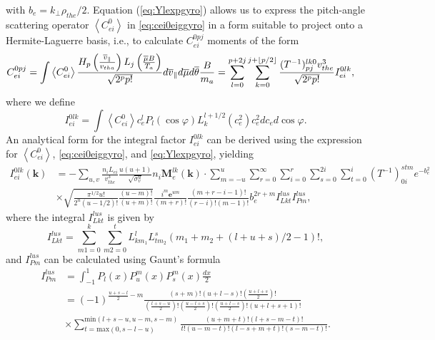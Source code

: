 %
with $b_e=k_\perp \rho_{the}/2$.
%
Equation (\ref{eq:Ylexpgyro}) allows us to express the pitch-angle scattering operator $\left<C_{ei}^0\right>$ in \cref{eq:cei0eiggyro} in a form suitable to project onto a Hermite-Laguerre basis, i.e., to calculate $C_{ei}^{0pj}$ moments of the form
%
\begin{align}
    C_{ei}^{0pj}&=\int \left<C_{ei}^0\right> \frac{H_p\left(\frac{\overline v_{\parallel}}{v_{tha}}\right)L_j\left(\frac{\overline \mu B}{T_a}\right) }{\sqrt{2^p p!}}  d\overline v_\parallel d \overline \mu d \overline \theta \frac{B}{m_a}=\sum_{l=0}^{p+2j}\sum_{k=0}^{j+\lfloor p/2\rfloor}\frac{(T^{-1})_{pj}^{lk0}v_{the}^3}{\sqrt{2^p p!}} I_{ei}^{0lk},
\label{eq:ceiopjgg}
\end{align}
%
where we define
%
\begin{equation}
    I_{ei}^{0lk}=\int \left<C_{ei}^0\right> c_e^l P_l(\cos \varphi) L_k^{l+1/2}(c_e^2) c_e^2 dc_e d\cos \varphi.
\label{eq:iei0lk}
\end{equation}
%
An analytical form for the integral factor $I_{ei}^{0lk}$ can be derived using the expression for $\left<C_{ei}^0\right>$, \cref{eq:cei0eiggyro}, and \cref{eq:Ylexpgyro}, yielding
%
\begin{align}
    I_{ei}^{0lk}(\mathbf k)&=-\sum_{u,v}\frac{n_i L_{ei}}{v_{the}^3}\frac{u(u+1)}{\sqrt{\sigma_v^u}} n_i \mathbf M_{e}^{lk}(\mathbf k) \cdot\sum_{m=-u}^u \sum_{r=0}^\infty \sum_{i=0}^{r}\sum_{s=0}^{2i}\sum_{t=0}^i(T^{-1})_{0i}^{stm}e^{-b_e^2}\nonumber\\
    &\times \sqrt{\frac{\pi^{1/2}u!}{2^u(u-1/2)!}\frac{(u-m)!}{(u+m)!}}\frac{i^m \mathbf e^{um}}{(m+r)!}\frac{(m+r-i-1)!}{(r-i)!(m-1)!}b_e^{2r+m}I_{L k t}^{l u s}I_{Pm}^{l u s},
\end{align}
%
where the integral $I_{L k t}^{l u s}$ is given by
%
\begin{equation}
    I_{L k t}^{l u s}=\sum_{m1=0}^{k}\sum_{m2=0}^{t}{L_{km_1}^{l}L_{tm_2}^s}(m_1+m_2+(l+u+s)/2-1)!,
\end{equation}
%
and $I_{Pm}^{l u s}$ can be calculated using Gaunt's formula \citep{Gaunt1929}
%
\begin{align}
    I_{Pm}^{l u s}&=\int_{-1}^{1} P_l(x)P_{u}^m(x)P_{s}^m(x) \frac{dx}{2}\nonumber\\
    &=(-1)^{\frac{u+s-l}{2}-m}\frac{(s+m)!(u+l-s)!\left(\frac{u+l+s}{2}\right)!}{\left(\frac{l+s-u}{2}\right)!\left(\frac{u-l+s}{2}\right)!\left(\frac{u+l-s}{2}\right)!(u+l+s+1)!}\nonumber\\
    &\times\sum_{t=\text{max}(0,s-l-u)}^{\text{min}(l+s-u,u-m,s-m)}\frac{(u+m+t)!(l+s-m-t)!}{t!(u-m-t)!(l-s+m+t)!(s-m-t)!}.
\label{eq:gaunt}
\end{align}
%

